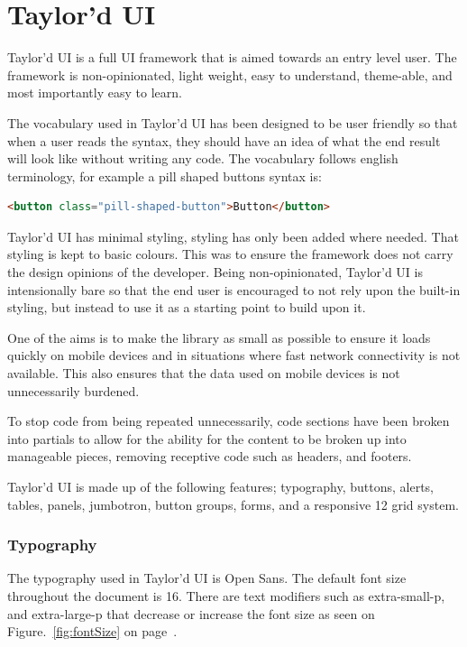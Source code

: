 \newpage
\chapter*{Taylor'd UI}

Taylor'd UI is a full \gls{UI} framework that is aimed towards an entry level user. The framework is non-opinionated, light weight, easy to understand, theme-able, and most importantly easy to learn. 

The vocabulary used in Taylor'd UI has been designed to be user friendly so that when a user reads the syntax, they should have an idea of what the end result will look like without writing any code. The vocabulary follows english terminology, for example a pill shaped buttons syntax is: 

\begin{lstlisting}[language=HTML]
<button class="pill-shaped-button">Button</button>
\end{lstlisting}

Taylor'd UI has minimal styling, styling has only been added where needed. That styling is kept to basic colours. This was to ensure the framework does not carry the design opinions of the developer. Being non-opinionated, Taylor'd UI is intensionally bare so that the end user is encouraged to not rely upon the built-in styling, but instead to use it as a starting point to build upon it. 

One of the aims is to make the library as small as possible to ensure it loads quickly on mobile devices and in situations where fast network connectivity is not available. This also ensures that the data used on mobile devices is not unnecessarily burdened.

To stop code from being repeated unnecessarily, code sections have been broken into partials to allow for the ability for the content to be broken up into manageable pieces, removing receptive code such as headers, and footers.

Taylor'd UI is made up of the following features; typography, buttons, alerts, tables, panels, jumbotron, button groups, forms, and a responsive 12 grid system.

\newpage
\subsection*{Typography}
The typography used in Taylor'd UI is Open Sans. The default font size throughout the document is 16. There are text modifiers such as extra-small-p, and extra-large-p that decrease or increase the font size as seen on Figure.~\ref{fig:fontSize} on  page~\pageref{fig:fontSize}. 


